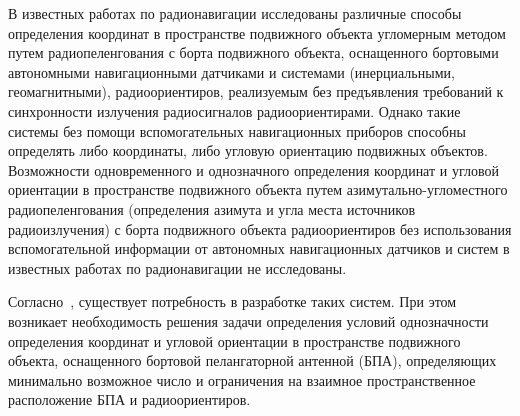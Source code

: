 \documentclass[../main.tex]{subfiles}
\begin{document}
В известных работах по радионавигации исследованы различные способы определения координат в пространстве подвижного объекта угломерным методом путем радиопеленгования с борта подвижного объекта, оснащенного бортовыми автономными навигационными датчиками и системами (инерциальными, геомагнитными), радиоориентиров, реализуемым без предъявления требований к синхронности излучения радиосигналов радиоориентирами. Однако такие системы без помощи вспомогательных навигационных приборов способны определять либо координаты, либо угловую ориентацию подвижных объектов. Возможности одновременного и однозначного определения координат и угловой ориентации в пространстве подвижного объекта путем азимутально-угломестного радиопеленгования (определения азимута и угла места источников радиоизлучения) с борта подвижного объекта радиоориентиров без использования вспомогательной информации от автономных навигационных датчиков и систем в известных работах по радионавигации не исследованы.

Согласно~\cite{REPORT:2015}, существует потребность в разработке таких систем. При этом возникает необходимость решения задачи определения условий однозначности определения координат и угловой ориентации в пространстве подвижного объекта, оснащенного бортовой пелангаторной антенной (БПА), определяющих минимально возможное число и ограничения на взаимное пространственное расположение БПА и радиоориентиров.
\end{document}

